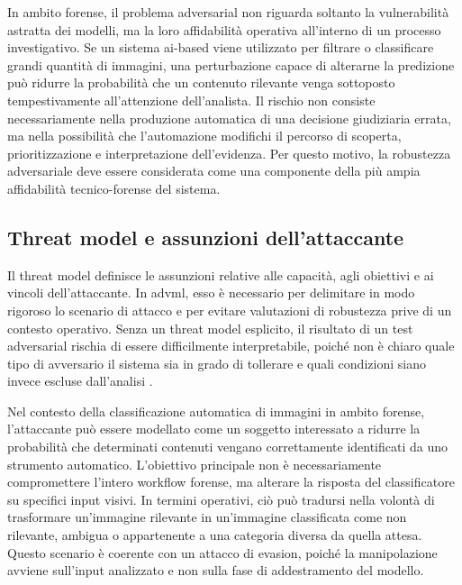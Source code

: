 In ambito forense, il problema adversarial non riguarda soltanto la vulnerabilità astratta dei modelli, ma la loro affidabilità operativa all'interno di un processo investigativo. Se un sistema \gls{ai}-based viene utilizzato per filtrare o classificare grandi quantità di immagini, una perturbazione capace di alterarne la predizione può ridurre la probabilità che un contenuto rilevante venga sottoposto tempestivamente all'attenzione dell'analista. Il rischio non consiste necessariamente nella produzione automatica di una decisione giudiziaria errata, ma nella possibilità che l'automazione modifichi il percorso di scoperta, prioritizzazione e interpretazione dell'evidenza. Per questo motivo, la robustezza adversariale deve essere considerata come una componente della più ampia affidabilità tecnico-forense del sistema.
\subsection{Threat model e assunzioni dell'attaccante}
\label{subsec:background_threat_model}
Il threat model definisce le assunzioni relative alle capacità, agli obiettivi e ai vincoli dell'attaccante. In \gls{advml}, esso è necessario per delimitare in modo rigoroso lo scenario di attacco e per evitare valutazioni di robustezza prive di un contesto operativo. Senza un threat model esplicito, il risultato di un test adversarial rischia di essere difficilmente interpretabile, poiché non è chiaro quale tipo di avversario il sistema sia in grado di tollerare e quali condizioni siano invece escluse dall'analisi \cite{carlini2017towards,yuan2019adversarial}.

Nel contesto della classificazione automatica di immagini in ambito forense, l'attaccante può essere modellato come un soggetto interessato a ridurre la probabilità che determinati contenuti vengano correttamente identificati da uno strumento automatico. L'obiettivo principale non è necessariamente compromettere l'intero workflow forense, ma alterare la risposta del classificatore su specifici input visivi. In termini operativi, ciò può tradursi nella volontà di trasformare un'immagine rilevante in un'immagine classificata come non rilevante, ambigua o appartenente a una categoria diversa da quella attesa. Questo scenario è coerente con un attacco di evasion, poiché la manipolazione avviene sull'input analizzato e non sulla fase di addestramento del modello.

